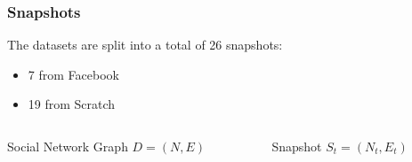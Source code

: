 \begin{frame}
\frametitle{Snapshots}
The datasets are split into a total of 26 snapshots:
\begin{itemize}
\item 7 from Facebook
\item 19 from Scratch
\end{itemize}
\begin{columns}
	\begin{column}{0.5\textwidth}
			\begin{block} {\small Social Network Graph}\centering
				$D = (N,E)$
			\end{block}
		\end{column}
		\begin{column}{0.5\textwidth}
			\begin{block} {\small Snapshot}\centering
				$S_t = (N_t,E_t)$
			\end{block}
		\end{column}
	\end{columns}
\end{frame}

